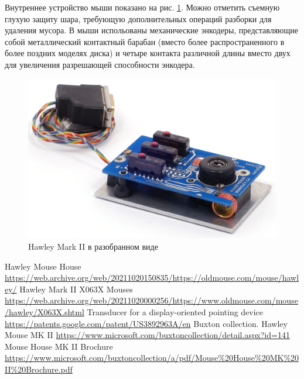 \documentclass[11pt, a4paper]{article}
\begin{document}
Внутреннее устройство мыши показано на рис. \ref{fig:HawleyMarkIIInside}. Можно отметить съемную глухую защиту шара, требующую дополнительных операций разборки для удаления мусора. В мыши испольованы механические энкодеры, представляющие собой металлический контактный барабан (вместо более распространенного в более поздних моделях диска) и четыре контакта различной длины вместо двух для увеличения разрешающей способности энкодера.

 \begin{figure}[h]
    \centering
    \includegraphics[scale=0.8]{1982_hawley_mark_ii/inside_60.jpg}
    \caption{Hawley Mark II в разобранном виде}
    \label{fig:HawleyMarkIIInside}
\end{figure}

\begin{thebibliography}{9}
 Hawley Mouse House \url{https://web.archive.org/web/20211020150835/https://oldmouse.com/mouse/hawley/}
 Hawley Mark II X063X Mouses \url{https://web.archive.org/web/20211020000256/https://www.oldmouse.com/mouse/hawley/X063X.shtml}
 Transducer for a display-oriented pointing device \url{https://patents.google.com/patent/US3892963A/en}
 Buxton collection. Hawley Mouse MK II \url{https://www.microsoft.com/buxtoncollection/detail.aspx?id=141}
 Mouse House MK II Brochure \url{https://www.microsoft.com/buxtoncollection/a/pdf/Mouse%20House%20MK%20II%20Brochure.pdf}
\end{thebibliography}
\end{document}

